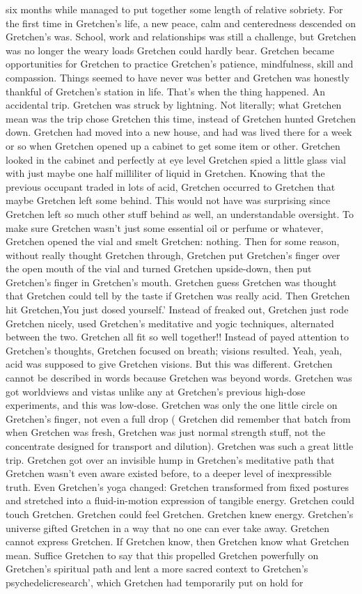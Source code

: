 \documentclass[12pt]{book}
\begin{document}
six months while managed to put together some length of relative sobriety. For the first time in Gretchen's life, a new peace, calm and centeredness descended on Gretchen's was. School, work and relationships was still a challenge, but Gretchen was no longer the weary loads Gretchen could hardly bear. Gretchen became opportunities for Gretchen to practice Gretchen's patience, mindfulness, skill and compassion. Things seemed to have never was better and Gretchen was honestly thankful of Gretchen's station in life. That's when the thing happened. An accidental trip. Gretchen was struck by lightning. Not literally; what Gretchen mean was the trip chose Gretchen this time, instead of Gretchen hunted Gretchen down. Gretchen had moved into a new house, and had was lived there for a week or so when Gretchen opened up a cabinet to get some item or other. Gretchen looked in the cabinet and perfectly at eye level Gretchen spied a little glass vial with just maybe one half milliliter of liquid in Gretchen. Knowing that the previous occupant traded in lots of acid, Gretchen occurred to Gretchen that maybe Gretchen left some behind. This would not have was surprising since Gretchen left so much other stuff behind as well, an understandable oversight. To make sure Gretchen wasn't just some essential oil or perfume or whatever, Gretchen opened the vial and smelt Gretchen: nothing. Then for some reason, without really thought Gretchen through, Gretchen put Gretchen's finger over the open mouth of the vial and turned Gretchen upside-down, then put Gretchen's finger in Gretchen's mouth. Gretchen guess Gretchen was thought that Gretchen could tell by the taste if Gretchen was really acid. Then Gretchen hit Gretchen,You just dosed yourself.' Instead of freaked out, Gretchen just rode Gretchen nicely, used Gretchen's meditative and yogic techniques, alternated between the two. Gretchen all fit so well together!! Instead of payed attention to Gretchen's thoughts, Gretchen focused on breath; visions resulted. Yeah, yeah, acid was supposed to give Gretchen visions. But this was different. Gretchen cannot be described in words because Gretchen was beyond words. Gretchen was got worldviews and vistas unlike any at Gretchen's previous high-dose experiments, and this was low-dose. Gretchen was only the one little circle on Gretchen's finger, not even a full drop ( Gretchen did remember that batch from when Gretchen was fresh, Gretchen was just normal strength stuff, not the concentrate designed for transport and dilution). Gretchen was such a great little trip. Gretchen got over an invisible hump in Gretchen's meditative path that Gretchen wasn't even aware existed before, to a deeper level of inexpressible truth. Even Gretchen's yoga changed: Gretchen transformed from fixed postures and stretched into a fluid-in-motion expression of tangible energy. Gretchen could touch Gretchen. Gretchen could feel Gretchen. Gretchen knew energy. Gretchen's universe gifted Gretchen in a way that no one can ever take away. Gretchen cannot express Gretchen. If Gretchen know, then Gretchen know what Gretchen mean. Suffice Gretchen to say that this propelled Gretchen powerfully on Gretchen's spiritual path and lent a more sacred context to Gretchen's psychedelicresearch', which Gretchen had temporarily put on hold for 
\end{document}
